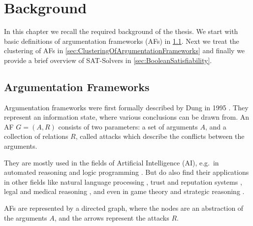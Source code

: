 \chapter{Background}
\label{ch:Background}
In this chapter we recall the required background of the thesis. We start with basic definitions of argumentation frameworks (AFs) in \cref{sec:ArgumentationFrameworks}. Next we treat the clustering of AFs in \cref{sec:ClusteringOfArgumentationFrameworks} and finally we provide a brief overview of SAT-Solvers in \cref{sec:BooleanSatisfiability}.

\section{Argumentation Frameworks}
\label{sec:ArgumentationFrameworks}

Argumentation frameworks were first formally described by Dung in 1995 \cite{DUNG1995321}. They represent an information state, where various conclusions can be drawn from. An AF $G = (A, R)$ consists of two parameters: a set of arguments $A$, and a collection of relations $R$, called attacks which describe the conflicts between the arguments.

They are mostly used in the fields of Artificial Intelligence (AI), e.g.\ in automated reasoning and logic programming \cite{AFINAIARLP, AFINAIARLPexample}. But do also find their applications in other fields like natural language processing \cite{AFINNLP}, trust and reputation systems \cite{AFINTaRS}, legal and medical reasoning \cite{legalAndMedicalReasoning}, and even in game theory and strategic reasoning \cite{AFinGames}.

AFs are represented by a directed graph, where the nodes are an abstraction of the arguments $A$, and the arrows represent the attacks $R$. 

